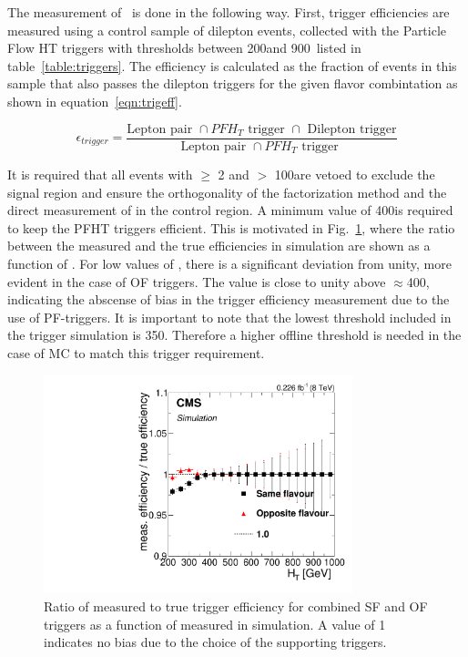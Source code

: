 The measurement of \rt\ is done in the following way.
First, trigger efficiencies are measured using a control sample of dilepton events,
collected with the Particle Flow HT triggers with thresholds between 200\GeV and 900\GeV\ listed in table~\ref{table:triggers}.
The efficiency is calculated as the fraction of events in this sample that also passes the dilepton triggers for the given flavor combintation as shown in equation~\ref{eqn:trigeff}.

\begin{equation}
\label{eqn:trigeff}
  \epsilon_{trigger} =\frac{\text{Lepton pair }\cap PFH_T \text{ trigger } \cap\text{ Dilepton trigger}  }{\text{Lepton pair }\cap PFH_T \text{ trigger }}
\end{equation} 

It is required that all events with \nj $\geq$ 2 and \MET $>$ 100\GeV are vetoed to exclude the signal region
and ensure the orthogonality of the factorization method and the direct measurement of \rsfof in the control region.
A minimum \HT value of 400\GeV is required to keep the PFHT triggers efficient.
This is motivated in Fig.~\ref{fig:triggerBias},
where the ratio between the measured and the true efficiencies in \ttbar simulation are shown as a function of \HT.
For low values of \HT, there is a significant deviation from unity,
more evident in the case of OF triggers.
The value is close to unity above $\approx$400\GeV,
indicating the abscense of bias in the trigger efficiency measurement due to the use of PF-\HT triggers.
It is important to note that the lowest \HT threshold included in the trigger simulation is 350\GeV.
Therefore a higher offline \HT threshold is needed in the case of MC to match this trigger requirement. 

\begin{figure}[htb]
  \begin{center}
    \includegraphics[width=0.8\textwidth]{bkgd/figs/Triggereff_AlphaTSyst_PFHT_HighHTExclusive_Run2015_25ns_HT_None.pdf}
    \caption{
      \label{fig:triggerBias}
      Ratio of measured to true trigger efficiency for combined SF and OF triggers as a function of \HT measured in \ttbar simulation.
      A value of 1 indicates no bias due to the choice of the supporting triggers.
    }
  \end{center}
\end{figure}

